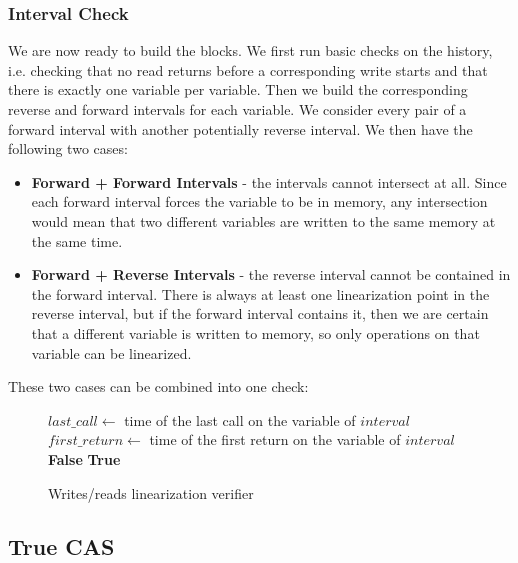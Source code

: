 \documentclass[oneside, a4paper, onecolumn, 10pt]{article}
\begin{document}
\subsubsection{Interval Check}
We are now ready to build the blocks. We first run basic checks on the history, i.e. checking that no read returns before a corresponding write starts and that there is exactly one variable per variable. Then we build the corresponding reverse and forward intervals for each variable. We consider every pair of a forward interval with another potentially reverse interval. We then have the following two cases:
\begin{itemize}
  \item \textbf{Forward + Forward Intervals} - the intervals cannot intersect at all. Since each forward interval forces the variable to be in memory, any intersection would mean that two different variables are written to the same memory at the same time.
  \item \textbf{Forward + Reverse Intervals} - the reverse interval cannot be contained in the forward interval. There is always at least one linearization point in the reverse interval, but if the forward interval contains it, then we are certain that a different variable is written to memory, so only operations on that variable can be linearized.
\end{itemize}
These two cases can be combined into one check:
\begin{figure}[h]
  \begin{center}
    \begin{algorithmic}[1]
      \State $last\_call \gets$ time of the last call on the variable of $interval$
      \State $first\_return \gets$ time of the first return on the variable of $interval$
      \State \Return \textbf{False}
      \EndIf
      \EndFor
      \EndFor
      \State \Return \textbf{True}
      \EndFunction
    \end{algorithmic}
  \end{center}
  \caption{\label{IO linearization verifier}Writes/reads linearization verifier}
\end{figure}
\subsection{True CAS}
\end{document}
